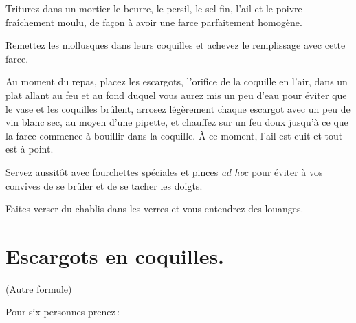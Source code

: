 \label{pg0305} \hypertarget{p0305}{}
Triturez dans un mortier le beurre, le persil, le sel fin, l'ail et le poivre
fraîchement moulu, de façon à avoir une farce parfaitement homogène.

Remettez les mollusques dans leurs coquilles et achevez le remplissage avec
cette farce.

Au moment du repas, placez les escargots, l'orifice de la coquille en l'air,
dans un plat allant au feu et au fond duquel vous aurez mis un peu d'eau pour
éviter que le vase et les coquilles brûlent, arrosez légèrement chaque escargot
avec un peu de vin blanc sec, au moyen d'une pipette, et chauffez sur un feu
doux jusqu'à ce que la farce commence à bouillir dans la coquille. À ce moment,
l'ail est cuit et tout est à point.

Servez aussitôt avec fourchettes spéciales et pinces \textit{ad hoc} pour
éviter à vos convives de se brûler et de se tacher les doigts.

Faites verser du chablis dans les verres et vous entendrez des louanges.

\section*{\centering Escargots en coquilles.}

\begin{center}
\sc\small(Autre formule)
\end{center}

\bigskip

Pour six personnes prenez :

